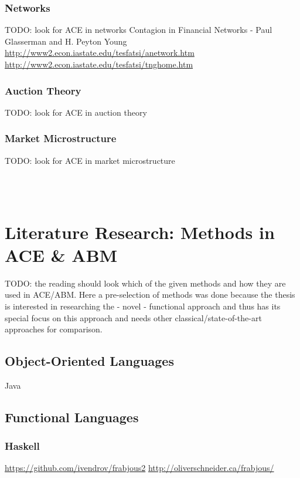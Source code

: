 \documentclass{article}
\begin{document}
\subsubsection{Networks}
TODO: look for ACE in networks
\cite{glasserman_2015} Contagion in Financial Networks - Paul Glasserman and H. Peyton Young\\
\url{http://www2.econ.iastate.edu/tesfatsi/anetwork.htm}
\url{http://www2.econ.iastate.edu/tesfatsi/tnghome.htm}

\subsubsection{Auction Theory}
TODO: look for ACE in auction theory

\subsubsection{Market Microstructure}
TODO: look for ACE in market microstructure

\cite{Budish2015} \\
\cite{aldridge_high_frequency_2009} \\


\section{Literature Research: Methods in ACE \& ABM}
TODO: the reading should look which of the given methods and how they are used in ACE/ABM. Here a pre-selection of methods was done because the thesis is interested in researching the - novel - functional approach and thus has its special focus on this approach and needs other classical/state-of-the-art approaches for comparison.

\subsection{Object-Oriented Languages}
Java \\

\subsection{Functional Languages}
\subsubsection{Haskell}
\url{https://github.com/ivendrov/frabjous2}
\cite{Schneider_2012}
\url{http://oliverschneider.ca/frabjous/}
\cite{Vendrov_2014}
\end{document}
